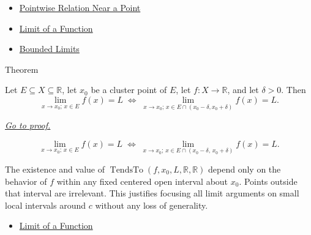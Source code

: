 \begin{dependencies}
\begin{itemize}
  \item \hyperref[def:pointwise-relation-near-point]{Pointwise Relation Near a Point}
  \item \hyperref[def:limit-function]{Limit of a Function}
  \item \hyperref[thm:bounded-limits]{Bounded Limits}
\end{itemize}
\end{dependencies}


\begin{theorembox}{Theorem}
\begin{theorem}
\label{thm:limits-are-local}
Let $E \subseteq X \subseteq \mathbb{R}$, let $x_0$ be a cluster
point of $E$, let $f : X \to \mathbb{R}$, and let $\delta > 0$.
Then
\[
  \lim_{x\to x_0;\,x\in E}f(x)=L
  \;\iff\;
  \lim_{x\to x_0;\,x\in E\cap(x_0-\delta,x_0+\delta)}f(x)=L.
\]

\smallskip\noindent
\hyperref[prf:limits-are-local]{\textit{Go to proof.}}
\end{theorem}
\end{theorembox}

\begin{remark*}
\[
  \lim_{x \to x_0;\, x \in E} f(x) = L
  \;\iff\;
  \lim_{x \to x_0;\, x \in E \cap (x_0 - \delta,\, x_0 + \delta)}
  f(x) = L.
\]
\end{remark*}

\begin{remark*}[Interpretation]
The existence and value of $\operatorname{TendsTo}(f,x_0,L,\mathbb{R},\mathbb{R})$
depend only on the behavior of $f$ within any fixed centered open interval
about $x_0$. Points outside that interval are irrelevant. This
justifies focusing all limit arguments on small local intervals around $c$
without any loss of generality.
\end{remark*}

\begin{dependencies}
\begin{itemize}
  \item \hyperref[def:limit-function]{Limit of a Function}
\end{itemize}
\end{dependencies}

